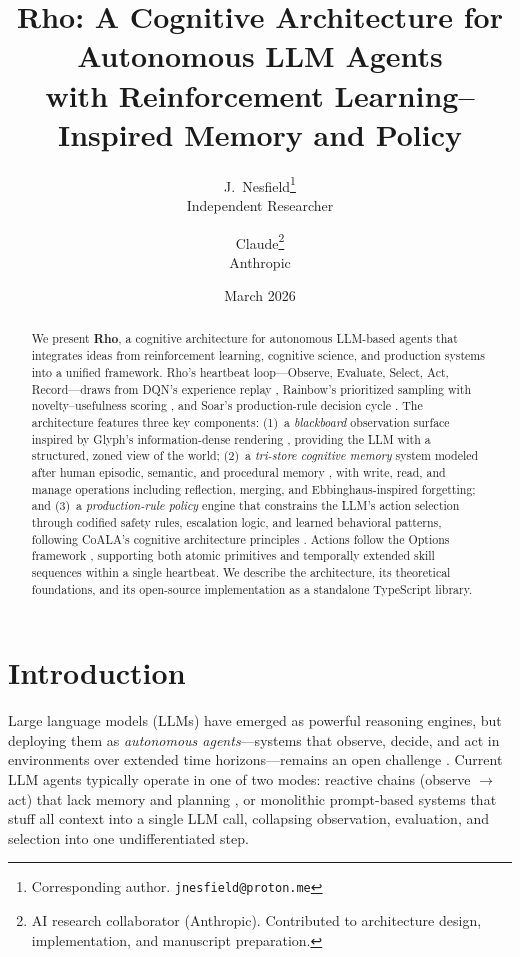 \documentclass[letterpaper]{article}
\title{Rho: A Cognitive Architecture for Autonomous LLM Agents \\with Reinforcement Learning--Inspired Memory and Policy}
\author{
  J.\ Nesfield\thanks{Corresponding author. \texttt{jnesfield@proton.me}} \\
  Independent Researcher \\
  \and
  Claude\thanks{AI research collaborator (Anthropic). Contributed to architecture design, implementation, and manuscript preparation.} \\
  Anthropic
}
\date{March 2026}
\begin{document}
\maketitle

\begin{abstract}
We present \textbf{Rho}, a cognitive architecture for autonomous LLM-based agents that integrates ideas from reinforcement learning, cognitive science, and production systems into a unified framework. Rho's heartbeat loop---Observe, Evaluate, Select, Act, Record---draws from DQN's experience replay \citep{mnih2015human}, Rainbow's prioritized sampling with novelty--usefulness scoring \citep{hessel2018rainbow}, and Soar's production-rule decision cycle \citep{laird2012soar}. 
The architecture features three key components: (1)~a \emph{blackboard} observation surface inspired by Glyph's information-dense rendering \citep{cheng2025glyph}, providing the LLM with a structured, zoned view of the world; (2)~a \emph{tri-store cognitive memory} system modeled after human episodic, semantic, and procedural memory \citep{tulving1972episodic}, with write, read, and manage operations including reflection, merging, and Ebbinghaus-inspired forgetting; and (3)~a \emph{production-rule policy} engine that constrains the LLM's action selection through codified safety rules, escalation logic, and learned behavioral patterns, following CoALA's cognitive architecture principles \citep{sumers2024cognitive}.
Actions follow the Options framework \citep{sutton1999between}, supporting both atomic primitives and temporally extended skill sequences within a single heartbeat. We describe the architecture, its theoretical foundations, and its open-source implementation as a standalone TypeScript library.
\end{abstract}

\section{Introduction}

Large language models (LLMs) have emerged as powerful reasoning engines, but deploying them as \emph{autonomous agents}---systems that observe, decide, and act in environments over extended time horizons---remains an open challenge \citep{wang2024survey, xi2023rise}. Current LLM agents typically operate in one of two modes: reactive chains (observe $\rightarrow$ act) that lack memory and planning \citep{yao2022react}, or monolithic prompt-based systems that stuff all context into a single LLM call, collapsing observation, evaluation, and selection into one undifferentiated step.
\end{document}
